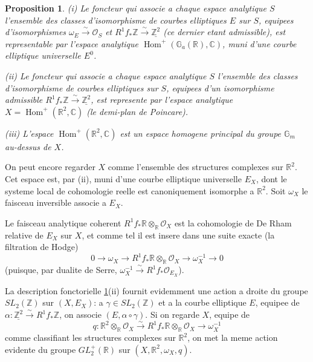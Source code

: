 \documentclass[11pt,reqno]{amsart}
\theoremstyle{plain}
\newtheorem{proposition}[theorem]{Proposition}
\theoremstyle{remark}
\DeclareMathOperator{\Hom}{Hom}
\newcommand{\shO}{\mathcal{O}}
\newcommand{\Z}{\mathbb{Z}}
\newcommand{\R}{\mathbb{R}}
\newcommand{\C}{\mathbb{C}}
\newcommand{\Gm}{\mathbb{G}_m}
\newcommand{\Ga}{\mathbb{G}_a}
\newcommand{\isom}{\xrightarrow{\sim}}
\numberwithin{equation}{section}
\begin{document}
\begin{proposition}\label{prop:2.2}
\textup{(i)} Le foncteur qui associe a chaque espace analytique $S$ l'ensemble des classes d'isomorphisme de courbes elliptiques $E$ sur $S$, equipees d'isomorphismes $\omega_E \isom \shO_S$ et $R^1f_*\Z \isom \underline{\Z^2}$ (ce dernier etant admissible), est representable par l'espace analytique $\Hom^+(\Ga(\R), \C)$, muni d'une courbe elliptique universelle $E^0$.

\textup{(ii)} Le foncteur qui associe a chaque espace analytique $S$ l'ensemble des classes d'isomorphisme de courbes elliptiques sur $S$, equipees d'un isomorphisme admissible $R^1f_*\Z \isom \underline{\Z^2}$, est represente par l'espace analytique $X = \Hom^+(\R^2, \C)$ (le demi-plan de Poincare).

\textup{(iii)} L'espace $\Hom^+(\R^2, \C)$ est un espace homogene principal du groupe $\Gm$ au-dessus de $X$.
\end{proposition}

On peut encore regarder $X$ comme l'ensemble des structures complexes sur $\R^2$. Cet espace est, par (ii), muni d'une courbe elliptique universelle $E_X$, dont le systeme local de cohomologie reelle est canoniquement isomorphe a $\R^2$. Soit $\omega_X$ le faisceau inversible associe a $E_X$.

Le faisceau analytique coherent $R^1f_*\R \otimes_\R \shO_X$ est la cohomologie de De Rham relative de $E_X$ sur $X$, et comme tel il est insere dans une suite exacte (la filtration de Hodge)
\begin{equation}\label{eq:Hodge}
0 \to \omega_X \to R^1f_*\R \otimes_\R \shO_X \to \omega_X^{-1} \to 0
\end{equation}
(puisque, par dualite de Serre, $\omega_X^{-1} \isom R^1f_*\shO_{E_X}$).

La description fonctorielle \ref{prop:2.2}(ii) fournit evidemment une action a droite du groupe $SL_2(\Z)$ sur $(X, E_X)$: a $\gamma \in SL_2(\Z)$ et a la courbe elliptique $E$, equipee de $\alpha: \underline{\Z^2} \isom R^1f_*\Z$, on associe $(E, \alpha \circ \gamma)$. Si on regarde $X$, equipe de
\[
q: \R^2 \otimes_\R \shO_X \isom R^1f_*\R \otimes_\R \shO_X \to \omega_X^{-1}
\]
comme classifiant les structures complexes sur $\R^2$, on met la meme action evidente du groupe $GL_2^+(\R)$ sur $(X, \R^2, \omega_X, q)$.

\subsection{}\label{subsec:2.3}
\end{document}
